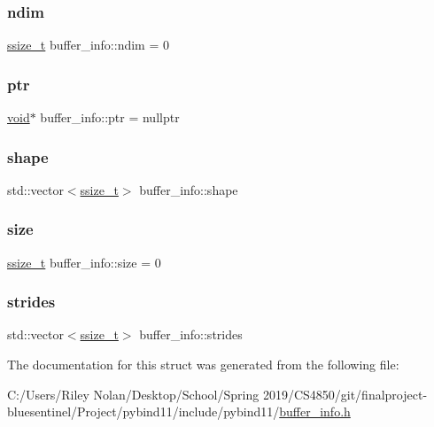 \subsubsection{\texorpdfstring{ndim}{ndim}}
{\footnotesize\ttfamily \mbox{\hyperlink{detail_2common_8h_ac430d16fc097b3bf0a7469cfd09decda}{ssize\+\_\+t}} buffer\+\_\+info\+::ndim = 0}

\mbox{\label{structbuffer__info_a2976ad4b157156ebbcffe667888e2d28}} 
\subsubsection{\texorpdfstring{ptr}{ptr}}
{\footnotesize\ttfamily \mbox{\hyperlink{_s_d_l__opengles2__gl2ext_8h_ae5d8fa23ad07c48bb609509eae494c95}{void}}$\ast$ buffer\+\_\+info\+::ptr = nullptr}

\mbox{\label{structbuffer__info_a69da91575dde98ab488789dfd2d8daf4}} 
\subsubsection{\texorpdfstring{shape}{shape}}
{\footnotesize\ttfamily std\+::vector$<$\mbox{\hyperlink{detail_2common_8h_ac430d16fc097b3bf0a7469cfd09decda}{ssize\+\_\+t}}$>$ buffer\+\_\+info\+::shape}

\mbox{\label{structbuffer__info_aa8d7471a42f3656b1b7a8b94d8fe03ae}} 
\subsubsection{\texorpdfstring{size}{size}}
{\footnotesize\ttfamily \mbox{\hyperlink{detail_2common_8h_ac430d16fc097b3bf0a7469cfd09decda}{ssize\+\_\+t}} buffer\+\_\+info\+::size = 0}

\mbox{\label{structbuffer__info_abd738097cc1960c4955040eec0619026}} 
\subsubsection{\texorpdfstring{strides}{strides}}
{\footnotesize\ttfamily std\+::vector$<$\mbox{\hyperlink{detail_2common_8h_ac430d16fc097b3bf0a7469cfd09decda}{ssize\+\_\+t}}$>$ buffer\+\_\+info\+::strides}



The documentation for this struct was generated from the following file\+:\begin{DoxyCompactItemize}
\item 
C\+:/\+Users/\+Riley Nolan/\+Desktop/\+School/\+Spring 2019/\+C\+S4850/git/finalproject-\/bluesentinel/\+Project/pybind11/include/pybind11/\mbox{\hyperlink{buffer__info_8h}{buffer\+\_\+info.\+h}}\end{DoxyCompactItemize}
